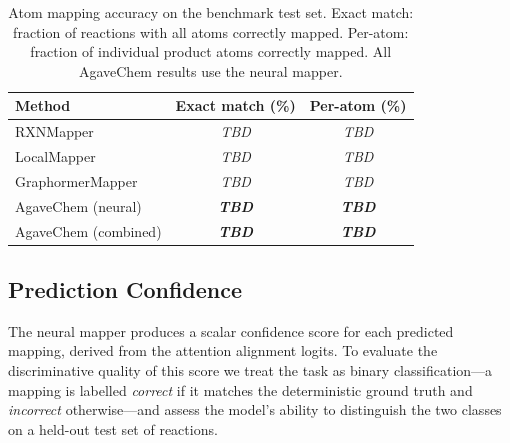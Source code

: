 \documentclass[12pt]{article}
\begin{document}
\begin{table}[htbp]
  \centering
  \caption{Atom mapping accuracy on the benchmark test set.
    Exact match: fraction of reactions with all atoms correctly mapped.
    Per-atom: fraction of individual product atoms correctly mapped.
    All AgaveChem results use the neural mapper.}
  \label{tab:main_results}
  \begin{tabular}{lcc}
    \toprule
    \textbf{Method}                      & \textbf{Exact match (\%)} & \textbf{Per-atom (\%)} \\
    \midrule
    RXNMapper~\cite{Schwaller2021}       & \textit{TBD}              & \textit{TBD}           \\
    LocalMapper~\cite{Chen2024}          & \textit{TBD}              & \textit{TBD}           \\
    GraphormerMapper~\cite{Nugmanov2022} & \textit{TBD}              & \textit{TBD}           \\
    \midrule
    AgaveChem (neural)                   & \textbf{\textit{TBD}}     & \textbf{\textit{TBD}}  \\
    AgaveChem (combined)                 & \textbf{\textit{TBD}}     & \textbf{\textit{TBD}}  \\
    \bottomrule
  \end{tabular}
\end{table}





\subsection{Prediction Confidence}
\label{subsec:prediction_confidence}

The neural mapper produces a scalar confidence score for each predicted
mapping, derived from the attention alignment logits.  To evaluate the
discriminative quality of this score we treat the task as binary
classification---a mapping is labelled \emph{correct} if it matches the
deterministic ground truth and \emph{incorrect} otherwise---and assess
the model's ability to distinguish the two classes on a held-out test
set of  reactions.
\end{document}
